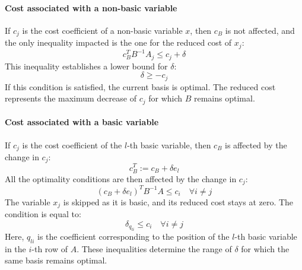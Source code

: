\paragraph*{Cost associated with a non-basic variable}
If $c_j$ is the cost coefficient of a non-basic variable $x$, then $c_B$ is not affected, and the only inequality impacted is the one for the reduced cost of $x_j$:
\[ c^T_B B^{-1} A_j \leq c_j + \delta \]
This inequality establishes a lower bound for $\delta$:
\[ \delta \geq - c_j \]
If this condition is satisfied, the current basis is optimal.
The reduced cost represents the maximum decrease of $c_j$ for which $B$ remains optimal.

\paragraph*{Cost associated with a basic variable}
If $c_j$ is the cost coefficient of the $l$-th basic variable, then $c_B$ is affected by the change in $c_j$:
\[ c^T_B := c_B + \delta  e_l \]
All the optimality conditions are then affected by the change in $c_j$:
\[ \left( c_B + \delta e_l \right)^T B^{-1} A \leq c_i \quad \forall i \neq j \]
The variable $x_j$ is skipped as it is basic, and its reduced cost stays at zero. 
The condition is equal to:
\[ \delta_{q_{li}} \leq c_i \quad \forall i \neq j \]
Here, $q_{li}$  is the coefficient corresponding to the position of the $l$-th basic variable in the $i$-th row of $A$.
These inequalities determine the range of $\delta$ for which the same basis remains optimal.